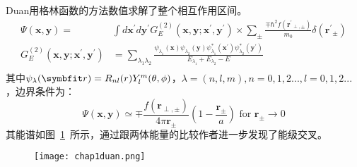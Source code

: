 Duan用格林函数的方法数值求解了整个相互作用区间。
\begin{equation}
\begin{aligned}
\Psi(\mathbf{x}, \mathbf{y})=& \int d \mathbf{x}^{\prime} d \mathbf{y}^{\prime} G_{E}^{(2)}\left(\mathbf{x}, \mathbf{y} ; \mathbf{x}^{\prime}, \mathbf{y}^{\prime}\right)\times \sum_{\pm} \frac{\mp \hbar^{2} f\left(\mathbf{r}^{\prime}{ }_{\perp, \pm}\right)}{m_{0}} \delta\left(\mathbf{r}^{\prime}{ }_{\pm}\right)\\
G_{E}^{(2)}\left(\mathbf{x}, \mathbf{y} ; \mathbf{x}^{\prime}, \mathbf{y}^{\prime}\right)&=\sum_{\lambda_{1} \lambda_{2}} \frac{\psi_{\lambda_{1}}(\mathbf{x}) \psi_{\lambda_{2}}(\mathbf{y}) \psi_{\lambda_{1}}^{*}\left(\mathbf{x}^{\prime}\right) \psi_{\lambda_{2}}^{*}\left(\mathbf{y}^{\prime}\right)}{E_{\lambda_{1}}+E_{\lambda_{2}}-E}\\
\end{aligned}
\end{equation}
其中$\psi_\lambda(\Vector{r}) = R_{nl}(r)Y_l^m(\theta,\phi)$，$\lambda = (n,l,m),n=0,1,2...,l=0,1,2...$，边界条件为：
\begin{equation}
\Psi(\mathbf{x}, \mathbf{y}) \simeq \mp \frac{f\left(\mathbf{r}_{\perp, \pm}\right)}{4 \pi \mathbf{r}_{\pm}}\left(1-\frac{\mathbf{r}_{\pm}}{a}\right) \text { for } \mathbf{r}_{\pm} \rightarrow 0
\end{equation}
其能谱如图~\ref{duan}~所示，通过跟两体能量的比较作者进一步发现了能级交叉。
\begin{figure}[!htbp]
    \centering
    \texttt{[image: chap1duan.png]}
    \label{duan}
\end{figure}

